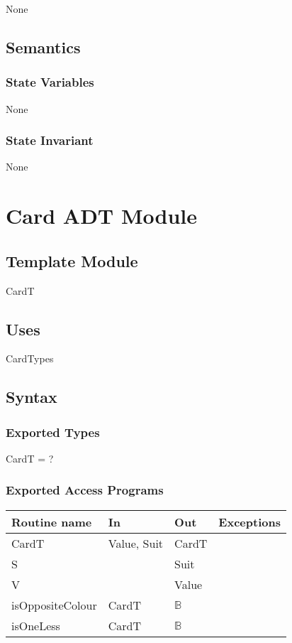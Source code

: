 \documentclass[12pt]{article}
\begin{document}
None

\subsection* {Semantics}

\subsubsection* {State Variables}

None

\subsubsection* {State Invariant}

None

\newpage

\section* {Card ADT Module}

\subsection*{Template Module}

CardT

\subsection* {Uses}

CardTypes

\subsection* {Syntax}

\subsubsection* {Exported Types}

CardT = ?

\subsubsection* {Exported Access Programs}

\begin{tabular}{| l | l | l | l |}
\hline
\textbf{Routine name} & \textbf{In} & \textbf{Out} & \textbf{Exceptions}\\
\hline
CardT & Value, Suit & CardT & \\
\hline
S & ~ & Suit & ~\\
\hline
V & ~ & Value & ~\\
\hline
isOppositeColour & CardT & $\mathbb{B}$ & ~\\
\hline
isOneLess & CardT & $\mathbb{B}$ & ~\\
\hline
\end{tabular}
\end{document}
